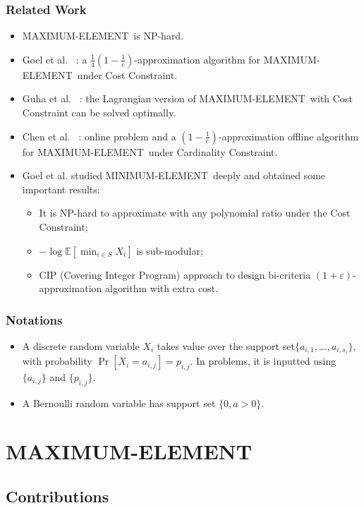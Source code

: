 \documentclass{beamer}
\newcommand{\Exp}{{\mathbb{E}}}
\newcommand{\MM}{{\textsf{MAXIMUM-ELEMENT}}}
\newcommand{\mm}{{\textsf{MINIMUM-ELEMENT}}}
\newcommand{\etal}{et al. }
\begin{document}
\begin{frame}
\frametitle{Related Work}
\begin{itemize}
    \item \MM\ is NP-hard.
    \item Goel \etal~\cite{Goel:asking}: a $\frac{1}{4}(1 - \frac{1}{e})$-approximation algorithm for \MM\ under Cost Constraint.
    \item Guha \etal~\cite{Guha07informationacquisition}: the Lagrangian version of \MM\ with Cost Constraint can be solved optimally.
    \item Chen \etal~\cite{NIPS2016:MAB}: online problem and a {\color{red}$(1-\frac{1}{e})$}-approximation offline algorithm for \MM\ under Cardinality Constraint.
    \item Goel \etal studied \mm\ deeply and obtained some important results:\cite{Goel:probe}
    \begin{itemize}
        \item It is NP-hard to approximate with any polynomial ratio under the Cost Constraint;
        \item $ -\log \Exp[\min_{i\in S} X_i]$ is sub-modular;
        \item CIP (Covering Integer Program) approach to design bi-criteria $(1+\varepsilon)$-approximation algorithm with extra cost.
    \end{itemize}
\end{itemize}
\end{frame}

\begin{frame}
    \frametitle{Notations}
    \begin{itemize}
        \item A discrete random variable $X_i$ takes value over the support set$\{a_{i,1}, \ldots, a_{i, s_i}\}$, with probability $\Pr[X_i = a_{i,j}] = p_{i,j}$. In problems, it is inputted using $\{a_{i,j}\}$ and $\{p_{i,j}\}$.
        \item A Bernoulli random variable has support set $\{0, a > 0\}$.
    \end{itemize}
\end{frame}

\section{MAXIMUM-ELEMENT}

\subsection{Contributions}
\end{document}
